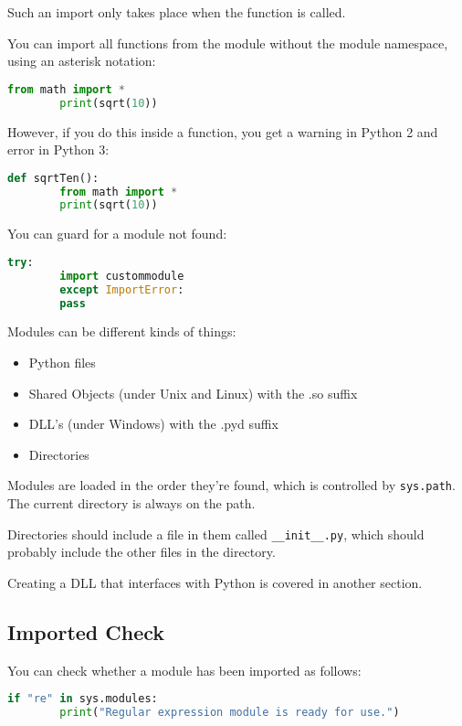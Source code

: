 \documentclass{article}
\begin{document}
	Such an import only takes place when the function is called.
	
	You can import all functions from the module without the module namespace, using an asterisk notation:
	
	\begin{lstlisting}[language=Python]
		from math import *
		print(sqrt(10))
	\end{lstlisting}
	
	However, if you do this inside a function, you get a warning in Python 2 and error in Python 3:
	
	\begin{lstlisting}[language=Python]
		def sqrtTen():
		from math import *
		print(sqrt(10))
	\end{lstlisting}
	
	You can guard for a module not found:
	
	\begin{lstlisting}[language=Python]
		try:
		import custommodule
		except ImportError:
		pass
	\end{lstlisting}
	
	Modules can be different kinds of things:
	
	\begin{itemize}
		\item Python files
		\item Shared Objects (under Unix and Linux) with the .so suffix
		\item DLL's (under Windows) with the .pyd suffix
		\item Directories
	\end{itemize}
	
	Modules are loaded in the order they're found, which is controlled by \texttt{sys.path}. The current directory is always on the path.
	
	Directories should include a file in them called \texttt{\_\_init\_\_.py}, which should probably include the other files in the directory.
	
	Creating a DLL that interfaces with Python is covered in another section.
	
	\subsection{Imported Check}
	
	You can check whether a module has been imported as follows:
	
	\begin{lstlisting}[language=Python]
		if "re" in sys.modules:
		print("Regular expression module is ready for use.")
	\end{lstlisting}
	
\end{document}
